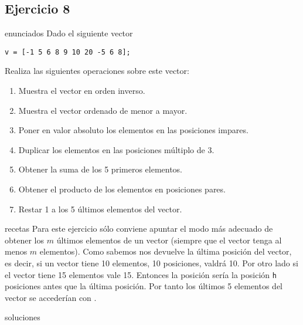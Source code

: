 \subsection{Ejercicio 8}
\def\parte{enunciados}
\ifx\capitulo\parte
Dado el siguiente vector
\begin{lstlisting}[style=matlab-style]
  v = [-1 5 6 8 9 10 20 -5 6 8];
\end{lstlisting}
Realiza las siguientes operaciones sobre este vector:
\begin{enumerate}
\item Muestra el vector en orden inverso.
\item Muestra el vector ordenado de menor a mayor.
\item Poner en valor absoluto los elementos en las posiciones impares.
\item Duplicar los elementos en las posiciones múltiplo de 3.
\item Obtener la suma de los 5 primeros elementos.
\item Obtener el producto de los elementos en posiciones pares.
\item Restar 1 a los 5 últimos elementos del vector.
\end{enumerate}
\fi

\def\parte{recetas}
\ifx\capitulo\parte
Para este ejercicio sólo conviene apuntar el modo más adecuado de obtener los $m$ últimos elementos de un vector (siempre que el vector tenga al menos $m$ elementos). Como sabemos  nos devuelve la última posición del vector, es decir, si un vector tiene 10 elementos, 10 posiciones,  valdrá 10. Por otro lado si el vector tiene 15 elementos  vale 15. Entonces la posición  sería la posición \texttt{h} posiciones antes que la última posición. Por tanto los últimos 5 elementos del vector se accederían con .
\fi

\def\parte{soluciones}
\ifx\capitulo\parte

\fi

